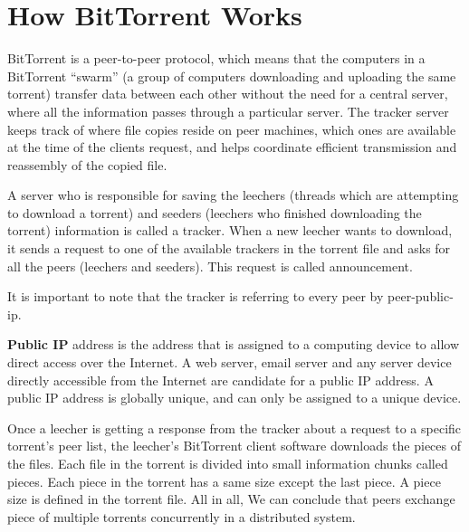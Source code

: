 \documentclass[11pt]{article}
\begin{document}
  \section*{How BitTorrent Works}
  \begin{flushleft}

    BitTorrent is a peer-to-peer protocol, which means that the computers in a BitTorrent “swarm” (a group of computers downloading and uploading the same torrent) transfer data between each other without the need for a central server, where all the information passes through a particular server.
    The tracker server keeps track of where file copies reside on peer machines, which ones are available at the time of the clients request, and helps coordinate efficient transmission and reassembly of the copied file.

  \end{flushleft}
  \begin{flushleft}

    A server who is responsible for saving the leechers (threads which  are attempting to download a torrent) and seeders (leechers who finished downloading the torrent) information is called a tracker. When a new leecher wants to download, it sends a request to one of the available trackers in the torrent file and asks for all the peers (leechers and seeders). This request is called announcement.

  \end{flushleft}
  \begin{flushleft}

    It is important to note that the tracker is referring to every peer by peer-public-ip.

  \end{flushleft}
  \begin{flushleft}

    \textbf{Public IP} address is the address that is assigned to a computing device to allow direct access over the Internet. A web server, email server and any server device directly accessible from the Internet are candidate for a public IP address. A public IP address is globally unique, and can only be assigned to a unique device.

  \end{flushleft}
  \begin{flushleft}

    Once a leecher is getting a response from the tracker about a request to a specific torrent's peer list, the leecher's BitTorrent client software downloads the pieces of the files. Each file in the torrent is divided into small information chunks called pieces. Each piece in the torrent has a same size except the last piece. A piece size is defined in the torrent file. All in all, We can conclude that peers exchange piece of multiple torrents concurrently in a distributed system.

  \end{flushleft}
\end{document}
